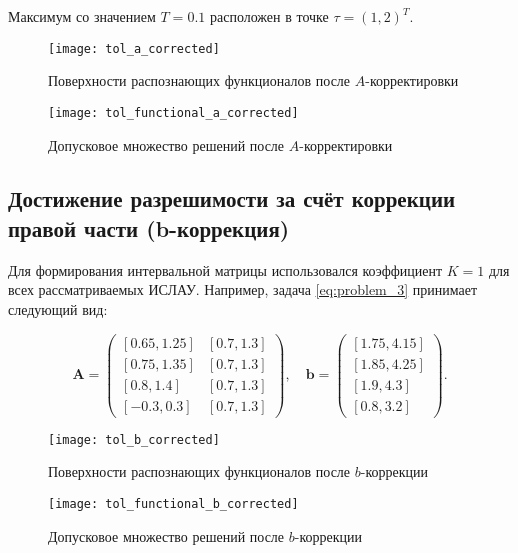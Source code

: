 \documentclass[a4paper,14pt]{article}
\begin{document}
  Максимум со значением \( T = 0.1 \) расположен в точке
  \( \tau = (1, 2)^T \).

  \begin{figure}[H]
		\begin{center}
			\texttt{[image: tol\_a\_corrected]}
			\caption{Поверхности распознающих функционалов после
        \( A \)-корректировки}
      \label{figure:tol_a_corrected}
		\end{center}
	\end{figure}

  \begin{figure}[H]
		\begin{center}
			\texttt{[image: tol\_functional\_a\_corrected]}
			\caption{Допусковое множество решений после \( A \)-корректировки}
      \label{figure:tol_functional_a_corrected}
		\end{center}
	\end{figure}

\subsection{Достижение разрешимости за счёт коррекции правой части (b-коррекция)}

Для формирования интервальной матрицы использовался коэффициент \( K = 1 \) для всех рассматриваемых ИСЛАУ. Например, задача \ref{eq:problem_3} принимает следующий вид:

\[
\mathbf{A} = \begin{pmatrix}
  [0.65, 1.25] & [0.7, 1.3] \\
  [0.75, 1.35] & [0.7, 1.3] \\
  [0.8, 1.4] & [0.7, 1.3] \\
  [-0.3, 0.3] & [0.7, 1.3]
\end{pmatrix}, \quad
\mathbf{b} = \begin{pmatrix}
  [1.75, 4.15] \\
  [1.85, 4.25] \\
  [1.9, 4.3] \\
  [0.8, 3.2]
\end{pmatrix}.
\]

\begin{figure}[H]
  \centering
  \texttt{[image: tol\_b\_corrected]}
  \caption{Поверхности распознающих функционалов после \( b \)-коррекции}
  \label{figure:tol_b_corrected}
\end{figure}

\begin{figure}[H]
  \centering
  \texttt{[image: tol\_functional\_b\_corrected]}
  \caption{Допусковое множество решений после \( b \)-коррекции}
  \label{figure:tol_functional_b_corrected}
\end{figure}
\end{document}
